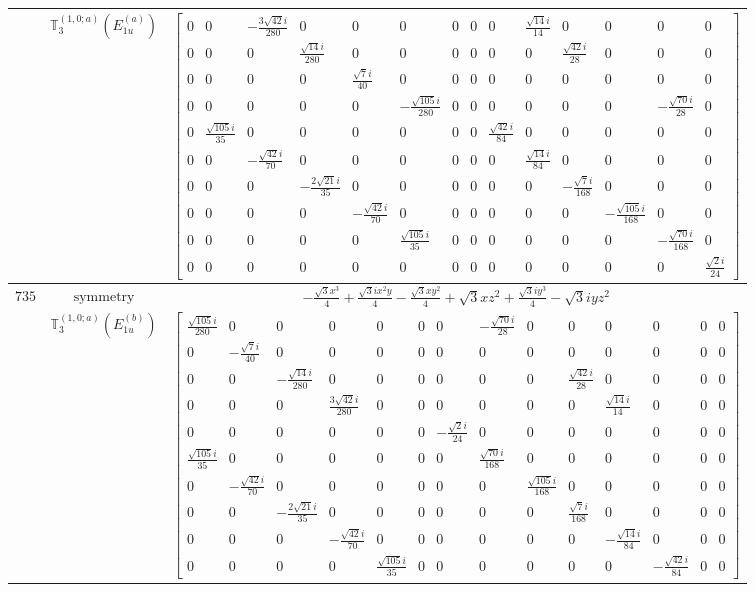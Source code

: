 \documentclass[fleqn,8pt,landscape]{jsarticle}
\begin{document}
\begin{longtable}{ccc}
$  $ & $ \mathbb{T}_{3}^{(1,0;a)}(E_{1u}^{(a)}) $ & $ \begin{bmatrix} 0 & 0 & - \frac{3 \sqrt{42} i}{280} & 0 & 0 & 0 & 0 & 0 & 0 & \frac{\sqrt{14} i}{14} & 0 & 0 & 0 & 0 \\ 0 & 0 & 0 & \frac{\sqrt{14} i}{280} & 0 & 0 & 0 & 0 & 0 & 0 & \frac{\sqrt{42} i}{28} & 0 & 0 & 0 \\ 0 & 0 & 0 & 0 & \frac{\sqrt{7} i}{40} & 0 & 0 & 0 & 0 & 0 & 0 & 0 & 0 & 0 \\ 0 & 0 & 0 & 0 & 0 & - \frac{\sqrt{105} i}{280} & 0 & 0 & 0 & 0 & 0 & 0 & - \frac{\sqrt{70} i}{28} & 0 \\ 0 & \frac{\sqrt{105} i}{35} & 0 & 0 & 0 & 0 & 0 & 0 & \frac{\sqrt{42} i}{84} & 0 & 0 & 0 & 0 & 0 \\ 0 & 0 & - \frac{\sqrt{42} i}{70} & 0 & 0 & 0 & 0 & 0 & 0 & \frac{\sqrt{14} i}{84} & 0 & 0 & 0 & 0 \\ 0 & 0 & 0 & - \frac{2 \sqrt{21} i}{35} & 0 & 0 & 0 & 0 & 0 & 0 & - \frac{\sqrt{7} i}{168} & 0 & 0 & 0 \\ 0 & 0 & 0 & 0 & - \frac{\sqrt{42} i}{70} & 0 & 0 & 0 & 0 & 0 & 0 & - \frac{\sqrt{105} i}{168} & 0 & 0 \\ 0 & 0 & 0 & 0 & 0 & \frac{\sqrt{105} i}{35} & 0 & 0 & 0 & 0 & 0 & 0 & - \frac{\sqrt{70} i}{168} & 0 \\ 0 & 0 & 0 & 0 & 0 & 0 & 0 & 0 & 0 & 0 & 0 & 0 & 0 & \frac{\sqrt{2} i}{24} \end{bmatrix} $ \\ \hline
$ 735 $ & $ \text{symmetry} $ & $ - \frac{\sqrt{3} x^{3}}{4} + \frac{\sqrt{3} i x^{2} y}{4} - \frac{\sqrt{3} x y^{2}}{4} + \sqrt{3} x z^{2} + \frac{\sqrt{3} i y^{3}}{4} - \sqrt{3} i y z^{2} $ \\
$  $ & $ \mathbb{T}_{3}^{(1,0;a)}(E_{1u}^{(b)}) $ & $ \begin{bmatrix} \frac{\sqrt{105} i}{280} & 0 & 0 & 0 & 0 & 0 & 0 & - \frac{\sqrt{70} i}{28} & 0 & 0 & 0 & 0 & 0 & 0 \\ 0 & - \frac{\sqrt{7} i}{40} & 0 & 0 & 0 & 0 & 0 & 0 & 0 & 0 & 0 & 0 & 0 & 0 \\ 0 & 0 & - \frac{\sqrt{14} i}{280} & 0 & 0 & 0 & 0 & 0 & 0 & \frac{\sqrt{42} i}{28} & 0 & 0 & 0 & 0 \\ 0 & 0 & 0 & \frac{3 \sqrt{42} i}{280} & 0 & 0 & 0 & 0 & 0 & 0 & \frac{\sqrt{14} i}{14} & 0 & 0 & 0 \\ 0 & 0 & 0 & 0 & 0 & 0 & - \frac{\sqrt{2} i}{24} & 0 & 0 & 0 & 0 & 0 & 0 & 0 \\ \frac{\sqrt{105} i}{35} & 0 & 0 & 0 & 0 & 0 & 0 & \frac{\sqrt{70} i}{168} & 0 & 0 & 0 & 0 & 0 & 0 \\ 0 & - \frac{\sqrt{42} i}{70} & 0 & 0 & 0 & 0 & 0 & 0 & \frac{\sqrt{105} i}{168} & 0 & 0 & 0 & 0 & 0 \\ 0 & 0 & - \frac{2 \sqrt{21} i}{35} & 0 & 0 & 0 & 0 & 0 & 0 & \frac{\sqrt{7} i}{168} & 0 & 0 & 0 & 0 \\ 0 & 0 & 0 & - \frac{\sqrt{42} i}{70} & 0 & 0 & 0 & 0 & 0 & 0 & - \frac{\sqrt{14} i}{84} & 0 & 0 & 0 \\ 0 & 0 & 0 & 0 & \frac{\sqrt{105} i}{35} & 0 & 0 & 0 & 0 & 0 & 0 & - \frac{\sqrt{42} i}{84} & 0 & 0 \end{bmatrix} $ \\ \hline

\end{longtable}
\end{document}
